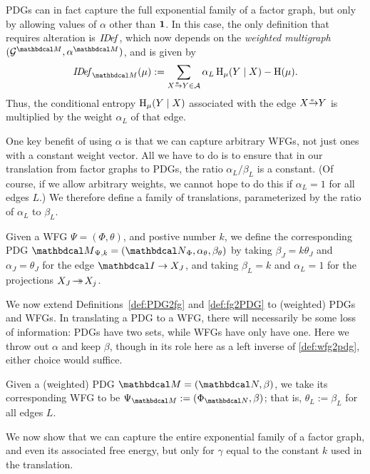 PDGs can in fact capture the full exponential family of a factor graph, but only
by allowing values of $\alpha$ other than ${\bf 1}$. In this case, the
only definition  
that requires alteration is $\mathit{I\mskip-3.0muD\mskip-2.5mue\mskip-1.5muf}_{}$, which now depends on the \emph{weighted multigraph}
$(\Gr^{\dg M}, \alpha^{\dg M})$, and is given by
\begin{equation}
	\IDef_{\dg M}(\mu) := \sum_{\ed aXY \in \Ar} \alpha_L \H_\mu(Y\mid X) - \H(\mu). 
	\label{eqn:alt-extra2}
\end{equation}
Thus, the conditional entropy $\operatorname{\mathrm{H}}_\mu(Y\mid X)$ associated with the
edge $\ed aXY$ is multiplied by the weight $\alpha_L$ of that edge.

One key benefit of using $\alpha$ is that we can
capture arbitrary WFGs, not just ones with a constant weight
vector.    All we have to do is to ensure that in our translation from
factor graphs to PDGs, the ratio $\alpha_L/\beta_L$ is a
constant.  (Of course, if we allow arbitrary weights, we cannot hope
to do this if $\alpha_L = 1$ for all edges $L$.)  
We therefore define a family of translations, parameterized by the
ratio of $\alpha_L$ to $\beta_L$.
\begin{defn}\label{def:wfg2pdg}
Given a WFG
$\Psi=(\Phi, \theta)$,
and postive number $k$, 
we define the corresponding PDG $\PDGof{\Psi,k} = (\UPDGof{\Phi},\alpha_{\theta}, \beta_{\theta})$ 
by taking $\beta_J = k \theta_J$ and $\alpha_J = \theta_J$ for the edge
 $\pdgunit  \rightarrow X_J$, and
taking $\beta_L = k$ and $\alpha_L = 1$ for the projections $X_J \!\rightarrow\mathrel{\mspace{-15mu}}\rightarrow\! X_j$.
\end{defn}

We now extend Definitions~\ref{def:PDG2fg} and \ref{def:fg2PDG} to
(weighted) PDGs and WFGs.  
In translating a PDG to a WFG, 
there will necessarily be some loss of information: PDGs have two sets, while WFGs have 
only have one. Here we throw out $\alpha$ and keep $\beta$, 
though in its role here as a left inverse of \cref{def:wfg2pdg},
either choice would suffice. 


\begin{defn}
Given a (weighted) PDG $\dg M =
(\dg N, \beta)$, we take its corresponding WFG to be $\WFGof{\dg M} :=
(\FGof{\dg N}, \beta)$; that is, $\theta_L := \beta_L$ for all edges $L$.
\end{defn}
We now show that we can capture the entire exponential family of a factor graph,
and even its associated free energy, 
but only for $\gamma$ equal to the constant $k$ used in
the translation.  


